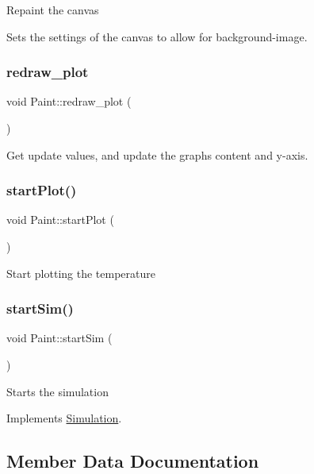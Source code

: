 Repaint the canvas

Sets the settings of the canvas to allow for background-\/image. \mbox{\label{classPaint_ab32de795b250bd919ebc0d8ebead6440}} 
\subsubsection{\texorpdfstring{redraw\_plot}{redraw\_plot}}
{\footnotesize\ttfamily void Paint\+::redraw\+\_\+plot (\begin{DoxyParamCaption}{ }\end{DoxyParamCaption})\hspace{0.3cm}{\ttfamily [slot]}}

Get update values, and update the graph\textquotesingle{}s content and y-\/axis. \mbox{\label{classPaint_ab8c4d8cbf3999cd2b80b299587ec9e83}} 
\subsubsection{\texorpdfstring{startPlot()}{startPlot()}}
{\footnotesize\ttfamily void Paint\+::start\+Plot (\begin{DoxyParamCaption}{ }\end{DoxyParamCaption})}

Start plotting the temperature \mbox{\label{classPaint_a1f01fcd27e595cc9aacd1ef94e3e1454}} 
\subsubsection{\texorpdfstring{startSim()}{startSim()}}
{\footnotesize\ttfamily void Paint\+::start\+Sim (\begin{DoxyParamCaption}{ }\end{DoxyParamCaption})\hspace{0.3cm}{\ttfamily [virtual]}}

Starts the simulation 

Implements \mbox{\hyperlink{classSimulation_ac523544ffc2b4cffed1d2a6ead5809b1}{Simulation}}.



\subsection{Member Data Documentation}
\mbox{\label{classPaint_a289c2a24e5186491ddd37a620eaac8b2}} 

